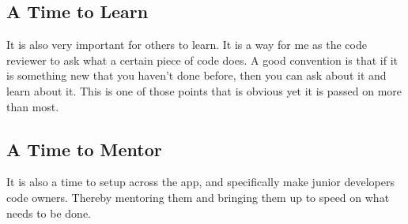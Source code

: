 \subsection{ A Time to Learn }
It is also very important for others to learn. It is a way for me as the code
reviewer to ask what a certain piece of code does. A good convention is that if
it is something new that you haven't done before, then you can ask about it
and learn about it. This is one of those points that is obvious yet it is passed
on more than most.

\subsection{ A Time to Mentor }
It is also a time to setup \codeowners{} across the app, and specifically make
junior developers code owners. Thereby mentoring them and bringing them up to
speed on what needs to be done. 
